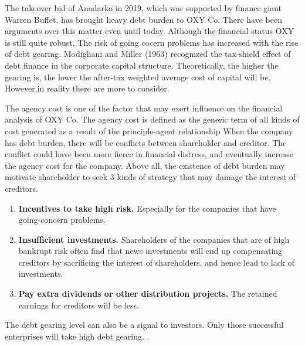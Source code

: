 \documentclass[
	a4paper, %
	12pt,%
]{CSSullivanBusinessReport}
\begin{document}
\begin{fullwidth}
The takeover bid of Anadarko in 2019, which was supported by finance giant Warren Buffet, has brought heavy debt burden to OXY Co. There have been arguments over this matter even until today.
Although the financial status OXY is still quite robust. The risk of going cocern problems has increased with the rise of debt gearing. 
Modigliani and Miller (1963) recognized the tax-shield effect of debt finance in the corporate capital structure.\cite{10.2307/1809167} Theoretically, the higher the gearing is, the lower the after-tax weighted average cost of capital will be. However,in reality there are more to consider. 
\par
The agency cost is one of the factor that may exert influence on the financial analysis of OXY Co. The agency cost is defined as the generic term of all kinds of cost generated as a result of the principle-agent relationship\cite{ross1973} When the company has debt burden, there will be conflicts between shareholder and creditor. The conflict could have been more fierce in financial distress, and eventually increase the agency cost for the company. Above all, the existence of debt burden may motivate shareholder to seek 3 kinds of strategy that may damage the interest of creditors.\cite{Ross1977}
\begin{enumerate}
    \item \textbf{Incentives to take high risk.} Especially for the companies that have going-concern problems.
    \item \textbf{Insufficient investments.} Shareholders of the companies that are of high bankrupt risk often find that news investments will end up compensating creditors by sacrificing the interest of shareholders, and hence lead to lack of investments.
    \item \textbf{Pay extra dividends or other distribution projects.} The retained earnings for creditors will be less.
    
\end{enumerate}
The debt gearing level can also be a signal to investors. Only those successful enterprises will take high debt gearing. \cite{incentivesignalling}.


\end{fullwidth}
\end{document}

